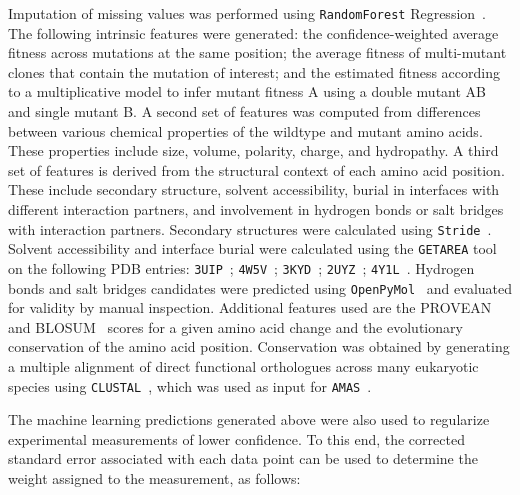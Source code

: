 Imputation of missing values was performed using \texttt{RandomForest} Regression~\cite{breiman_random_2001}. The following intrinsic features were generated: the confidence-weighted average fitness across mutations at the same position; the average fitness of multi-mutant clones that contain the mutation of interest; and the estimated fitness according to a multiplicative model to infer mutant fitness A using a double mutant AB and single mutant B.
A second set of features was computed from differences between various chemical properties of the wildtype and mutant amino acids. These properties include size, volume, polarity, charge, and hydropathy.
A third set of features is derived from the structural context of each amino acid position. These include secondary structure, solvent accessibility, burial in interfaces with different interaction partners, and involvement in hydrogen bonds or salt bridges with interaction partners. Secondary structures were calculated using \texttt{Stride}~\cite{frishman_knowledge-based_1995}. Solvent accessibility and interface burial were calculated using the \texttt{GETAREA} tool~\cite{fraczkiewicz_exact_1998} on the following PDB entries: \texttt{3UIP}~\cite{gareau_determinants_2012}; \texttt{4W5V}~\cite{reiter_characterization_2016}; \texttt{3KYD}~\cite{olsen_active_2010}; \texttt{2UYZ}~\cite{knipscheer_noncovalent_2007}; \texttt{4Y1L}~\cite{alontaga_rwd_2015}. Hydrogen bonds and salt bridges candidates were predicted using \texttt{OpenPyMol}~\cite{schrodinger_pymol_2016} and evaluated for validity by manual inspection.
Additional features used are the PROVEAN~\cite{choi_predicting_2012} and BLOSUM~\cite{henikoff_amino_1992} scores for a given amino acid change and the evolutionary conservation of the amino acid position. Conservation was obtained by generating a multiple alignment of direct functional orthologues across many eukaryotic species using \texttt{CLUSTAL}~\cite{russell_clustal_2014}, which was used as input for \texttt{AMAS}~\cite{livingstone_protein_1993}.

The machine learning predictions generated above were also used to regularize experimental measurements of lower confidence. To this end, the corrected standard error associated with each data point can be used to determine the weight assigned to the measurement, as follows:
 
